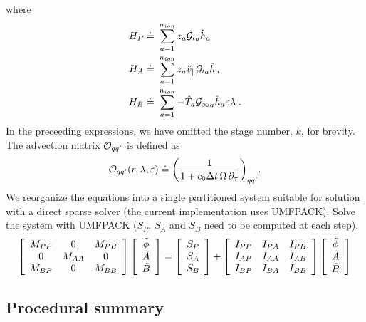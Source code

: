 %
where
%
\begin{align}
H_{P} \doteq &~\sum_{a=1}^{n_{ion}} z_{a} {\cal G_0}_{a} 
\hat{h}_{a} \\
H_{A} \doteq&~\sum_{a=1}^{n_{ion}} z_{a} \hat{v}_{\parallel} {\cal G_0}_{a} 
\hat{h}_{a} \\
H_{B} \doteq&~\sum_{a=1}^{n_{ion}} -\hat{T}_{a} 
{\cal G_1}_{a} \hat{h}_{a} \varepsilon \lambda \; .
\end{align}
%
In the preceeding expressions, we have omitted the stage number, $k$, for 
brevity.  The advection matrix ${\cal O}_{q q^\prime}$ is defined as
%
\begin{equation}
{\cal O}_{q q^\prime} (r,\lambda,{\varepsilon}) \doteq
{\left( \frac{1}{1+c_0 {\Delta t}\, \Omega \, \partial_\tau} \right)}_{q q^\prime} .
\end{equation}
%
We reorganize the equations into a single partitioned system
suitable for solution with a direct sparse solver (the 
current implementation uses UMFPACK).  Solve the system 
with UMFPACK ($S_P$, $S_A$ and $S_B$ need to be computed at each step). 
%
\begin{equation}
\left[ \begin{array}{ccc}
M_{PP} & 0      & M_{PB} \\
0      & M_{AA} & 0 \\
M_{BP} & 0      & M_{BB} 
\end{array} \right]
\left[ \begin{array}{c}
\tilde{\phi} \\ \tilde{A} \\ \tilde{B} 
\end{array} \right]
= \left[ \begin{array}{c}
S_{P} \\ S_{A} \\ S_{B}
\end{array} \right]
+ \left[ \begin{array}{ccc}
I_{PP} & I_{PA} & I_{PB} \\
I_{AP} & I_{AA} & I_{AB} \\
I_{BP} & I_{BA} & I_{BB}
\end{array} \right]
\left[ \begin{array}{c}
\tilde{\phi} \\ \tilde{A} \\ \tilde{B} 
\end{array} \right]
\label{imex.field}
\end{equation}

\subsection{Procedural summary}

